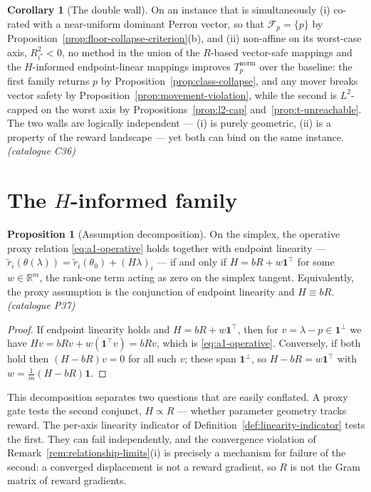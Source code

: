 \documentclass[12pt,a4paper]{report}
\newcommand{\R}{\mathbb{R}}
\newcommand{\1}{\mathbf{1}}
\newcommand{\Floor}{\mathcal{F}_{p}}
\theoremstyle{definition}
\newtheorem{proposition}[definition]{Proposition}
\newtheorem{corollary}[definition]{Corollary}
\begin{document}
\begin{corollary}[The double wall]
\label{cor:double-wall}
On an instance that is simultaneously (i) co-rated with a near-uniform dominant Perron vector, so that \(\Floor=\{p\}\) by Proposition~\ref{prop:floor-collapse-criterion}(b), and (ii) non-affine on its worst-case axis, \(R^2_{i^\star}<0\), no method in the union of the \(R\)-based vector-safe mappings and the \(H\)-informed endpoint-linear mappings improves \(T_p^{\mathrm{norm}}\) over the baseline: the first family returns \(p\) by Proposition~\ref{prop:class-collapse}, and any mover breaks vector safety by Proposition~\ref{prop:movement-violation}, while the second is \(L^2\)-capped on the worst axis by Propositions~\ref{prop:l2-cap} and~\ref{prop:t-unreachable}. The two walls are logically independent --- (i) is purely geometric, (ii) is a property of the reward landscape --- yet both can bind on the same instance. \emph{(catalogue C36)}
\end{corollary}

\section{The \(H\)-informed family}

\begin{proposition}[Assumption decomposition]
\label{prop:assumption-decomposition}
On the simplex, the operative proxy relation \eqref{eq:a1-operative} holds together with endpoint linearity --- \(\tilde r_i(\theta(\lambda))=\tilde r_i(\theta_0)+(H\lambda)_i\) --- if and only if \(H=bR+w\1^\top\) for some \(w\in\R^m\), the rank-one term acting as zero on the simplex tangent. Equivalently, the proxy assumption is the conjunction of endpoint linearity and \(H\equiv bR\). \emph{(catalogue P37)}
\end{proposition}

\begin{proof}
If endpoint linearity holds and \(H=bR+w\1^\top\), then for \(v=\lambda-p\in\1^\perp\) we have \(Hv=bRv+w(\1^\top v)=bRv\), which is \eqref{eq:a1-operative}. Conversely, if both hold then \((H-bR)v=0\) for all such \(v\); these span \(\1^\perp\), so \(H-bR=w\1^\top\) with \(w=\tfrac1m(H-bR)\1\).
\end{proof}

This decomposition separates two questions that are easily conflated. A proxy gate tests the second conjunct, \(H\propto R\) --- whether parameter geometry tracks reward. The per-axis linearity indicator of Definition~\ref{def:linearity-indicator} tests the first. They can fail independently, and the convergence violation of Remark~\ref{rem:relationship-limits}(i) is precisely a mechanism for failure of the second: a converged displacement is not a reward gradient, so \(R\) is not the Gram matrix of reward gradients.
\end{document}
